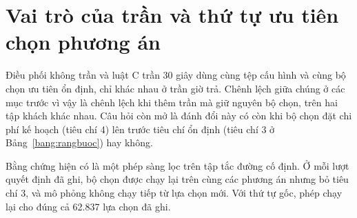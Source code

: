 
\section{Vai trò của trần và thứ tự ưu tiên chọn phương án}
\label{muc:c4-vaitro}

Điều phối không trần và luật C trần 30 giây dùng cùng tệp cấu hình và cùng bộ chọn ưu tiên ổn định, chỉ khác nhau
ở trần giờ trả. Chênh lệch giữa chúng ở các mục trước vì vậy là chênh lệch khi thêm trần mà giữ nguyên bộ chọn, trên
hai tập khách khác nhau. Câu hỏi còn mở là đánh đổi này có còn khi bộ chọn đặt chi phí kế hoạch (tiêu chí 4) lên
trước tiêu chí ổn định (tiêu chí 3 ở Bảng~\ref{bang:rangbuoc}) hay không.

Bằng chứng hiện có là một phép sàng lọc trên tập tắc đường cố định. Ở mỗi lượt quyết định đã ghi, bộ chọn được chạy
lại trên cùng các phương án nhưng bỏ tiêu chí 3, và mô phỏng không chạy tiếp từ lựa chọn mới. Với thứ tự gốc, phép
chạy lại cho đúng cả 62.837 lựa chọn đã ghi.

